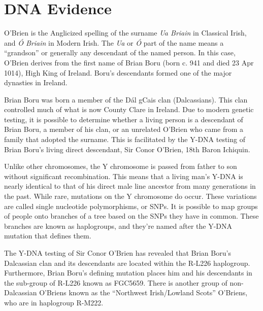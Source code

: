 \chapter{DNA Evidence}

O'Brien is the Anglicized spelling of the surname \textit{Ua Briain} in Classical Irish, and \textit{\'{O} Briain} in Modern Irish. The \textit{Ua} or \textit{\'{O}} part of the name means a ``grandson'' or generally any descendant of the named person. In this case, O'Brien derives from the first name of Brian Boru (born c. 941 and died 23 Apr 1014), High King of Ireland. Boru's descendants formed one of the major dynasties in Ireland.\cite{BoruHistorical}

Brian Boru was born a member of the D\'{a}l gCais clan (Dalcassians). This clan controlled much of what is now County Clare in Ireland.\cite{BoruEarlyHistory} Due to modern genetic testing, it is possible to determine whether a living person is a descendant of Brian Boru, a member of his clan, or an unrelated O'Brien who came from a family that adopted the surname. This is facilitated by the Y-DNA testing of Brian Boru's living direct descendant, Sir Conor O'Brien, 18th Baron Ichiquin.\cite{GGI:1}

Unlike other chromosomes, the Y chromosome is passed from father to son without significant recombination. This means that a living man's Y-DNA is nearly identical to that of his direct male line ancestor from many generations in the past. While rare, mutations on the Y chromosome do occur. These variations are called single nucleotide polymorphisms, or SNPs. It is possible to map groups of people onto branches of a tree based on the SNPs they have in common. These branches are known as haplogroups, and they're named after the Y-DNA mutation that defines them.\cite{Bettinger}

The Y-DNA testing of Sir Conor O'Brien has revealed that Brian Boru's Dalcassian clan and its descendants are located within the R-L226 haplogroup. Furthermore, Brian Boru's defining mutation places him and his descendants in the sub-group of R-L226 known as FGC5659. There is another group of non-Dalcassian O'Briens known as the ``Northwest Irish/Lowland Scots'' O'Briens, who are in haplogroup R-M222.\cite{GGI:2}


